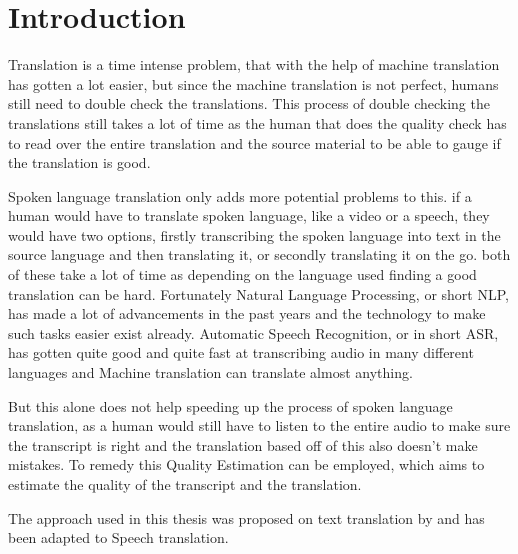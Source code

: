 
\chapter{Introduction}
\label{ch:Introduction}

Translation is a time intense problem, that with the help of machine translation has gotten a lot easier, but since the machine translation is not perfect, humans still need to double check the translations. This process of double checking the translations still takes a lot of time as the human that does the quality check has to read over the entire translation and the source material to be able to gauge if the translation is good. 

Spoken language translation only adds more potential problems to this. if a human would have to translate spoken language, like a video or a speech, they would have two options, firstly transcribing the spoken language into text in the source language and then translating it, or secondly translating it on the go. both of these take a lot of time as depending on the language used finding a good translation can be hard. 
Fortunately Natural Language Processing, or short NLP, has made a lot of advancements in the past years and the technology to make such tasks easier exist already. 
Automatic Speech Recognition, or in short ASR, has gotten quite good and quite fast at transcribing audio in many different languages and Machine translation can translate almost anything. 

But this alone does not help speeding up the process of spoken language translation, as a human would still have to listen to the entire audio to make sure the transcript is right and the translation based off of this also doesn't make mistakes. 
To remedy this Quality Estimation can be employed, which aims to estimate the quality of the transcript and the translation. 


The approach used in this thesis was proposed on text translation by \cite{fomicheva2020unsupervised} and has been adapted to Speech translation. 

